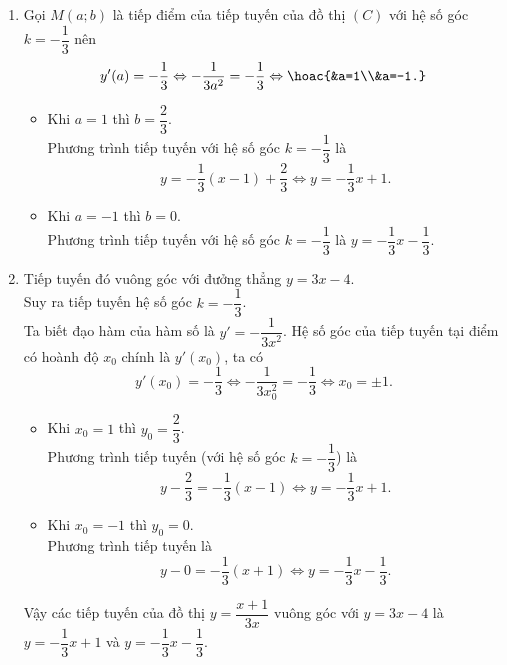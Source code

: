 \begin{ex}
{\begin{enumerate}
\[			\] 
			\begin{itemize}
				\item Tại $x=-1$  nên $y=0$.\\
				Phương trình tiếp tuyến tại điểm $ (-1; 0) $ là  $$ y=y'\left(-1\right)(x+1)+0 \Leftrightarrow y=-\dfrac{1}{3} x-\dfrac{1}{3}.$$
				\item Tại $x=\dfrac{1}{3}$ nên  $y=\dfrac{4}{3}$.\\
				Phương trình tiếp tuyến tại điểm $ \left(\dfrac{1}{3}; \dfrac{4}{3}\right) $ là $$ y=y'\left(\dfrac{1}{3}\right)\left(x-\dfrac{1}{3}\right)+\dfrac{4}{3}  \Leftrightarrow y=-3\left(x-\dfrac{1}{3}\right)+\dfrac{4}{3} \Leftrightarrow y=-3x+3.$$
			\end{itemize}
			\item Gọi $ M(a; b)  $ là tiếp điểm của tiếp tuyến của đồ thị $ (C) $ với hệ số góc $ k=-\dfrac{1}{3} $ nên
			\[ 
			 y'(a)=-\dfrac{1}{3} \Leftrightarrow-\dfrac{1}{3 a^{2}}=-\dfrac{1}{3} \Leftrightarrow\hoac{&a=1\\&a=-1.}
			\] 
			\begin{itemize}
				 \item Khi $a=1$ thì $b=\dfrac{2}{3}$.\\
				Phương trình  tiếp tuyến với hệ số góc $ k=-\dfrac{1}{3} $ là $$ y=-\dfrac{1}{3}(x-1)+\dfrac{2}{3} \Leftrightarrow y=-\dfrac{1}{3} x+1.$$
				\item  Khi $a=-1$ thì $b=0$.\\
				Phương trình tiếp tuyến với hệ số góc  $ k=-\dfrac{1}{3} $ là $y=-\dfrac{1}{3} x-\dfrac{1}{3}$.
			\end{itemize}
			\item Tiếp tuyến đó  vuông góc với đưởng thẳng $ y=3 x-4 $.\\
			Suy ra tiếp tuyến hệ số góc $  k=-\dfrac{1}{3} $.\\
			Ta biết đạo hàm của hàm số là $y'=-\dfrac{1}{3x^{2}}$. Hệ số góc của tiếp tuyến tại điểm có hoành độ $x_{0}$ chính là  $y'(x_{0})$, ta có
			\[ 
			y'(x_{0})=-\dfrac{1}{3}\Leftrightarrow -\dfrac{1}{3x_{0}^{2}}=-\dfrac{1}{3}\Leftrightarrow  x_0=\pm 1.
			 \]
			\begin{itemize}
				\item Khi $x_0=1$ thì  $y_0=\dfrac{2}{3}$.\\
				Phương trình  tiếp tuyến (với hệ số góc $k=-\dfrac{1}{3}$) là
				 \[
				y-\dfrac{2}{3}=-\dfrac{1}{3}\left(x-1\right)\Leftrightarrow y=-\dfrac{1}{3}x+1. 
				\] 
				 \item Khi $x_0=-1$ thì $y_0=0$.\\
				Phương trình tiếp tuyến  là
				 \[
				 y-0=-\dfrac{1}{3}\left(x+1\right)\Leftrightarrow y=-\dfrac{1}{3}x-\dfrac{1}{3}.
				 \]
			\end{itemize}
			Vậy các tiếp tuyến của đồ thị $y=\dfrac{x+1}{3x}$ vuông góc với $y=3x-4$ là $y=-\dfrac{1}{3}x+1$ và $y=-\dfrac{1}{3}x-\dfrac{1}{3}$. 
		\end{enumerate}
	} 
\end{ex}

